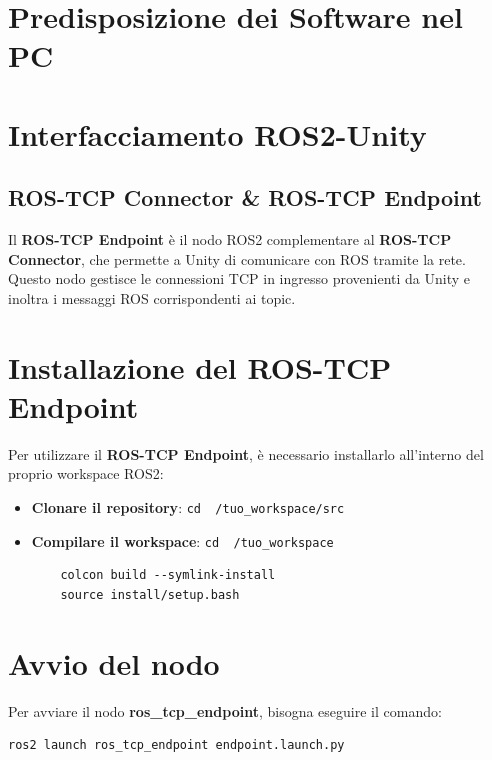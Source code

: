 \documentclass[11pt]{report}
\begin{document}

\section{Predisposizione dei Software nel PC}

\section{Interfacciamento ROS2-Unity}

\subsection{ROS-TCP Connector \& ROS-TCP Endpoint}
Il \textbf{ROS-TCP Endpoint} è il nodo ROS2 complementare al \textbf{ROS-TCP Connector}, che permette a Unity di comunicare con ROS tramite la rete. Questo nodo gestisce le connessioni TCP in ingresso provenienti da Unity e inoltra i messaggi ROS corrispondenti ai topic.

\section*{\textbf{Installazione del ROS-TCP Endpoint}}
Per utilizzare il \textbf{ROS-TCP Endpoint}, è necessario installarlo all'interno del proprio workspace ROS2:

\begin{itemize}
    \item \textbf{Clonare il repository}: \texttt{cd ~/tuo\_workspace/src}
    \item \textbf{Compilare il workspace}: \texttt{cd ~/tuo\_workspace}
    \begin{verbatim}
    colcon build --symlink-install
    source install/setup.bash
    \end{verbatim}
\end{itemize}

\section*{\textbf{Avvio del nodo}}

Per avviare il nodo \textbf{ros\_tcp\_endpoint}, bisogna eseguire il comando:

\begin{verbatim}
ros2 launch ros_tcp_endpoint endpoint.launch.py
\end{verbatim}
\end{document}
